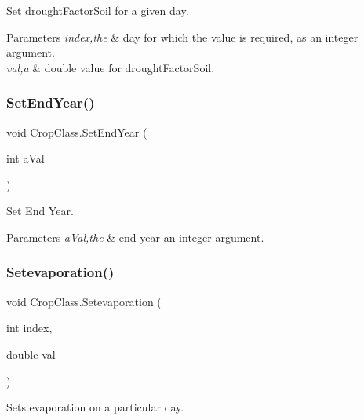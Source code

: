 Set drought\+Factor\+Soil for a given day. 


\begin{DoxyParams}{Parameters}
{\em index,the} & day for which the value is required, as an integer argument. \\
\hline
{\em val,a} & double value for drought\+Factor\+Soil. \\
\hline
\end{DoxyParams}
\mbox{\label{class_crop_class_aae4526fb10124338a29d0cfbcc93db7e}} 
\subsubsection{\texorpdfstring{SetEndYear()}{SetEndYear()}}
{\footnotesize\ttfamily void Crop\+Class.\+Set\+End\+Year (\begin{DoxyParamCaption}\item[{int}]{a\+Val }\end{DoxyParamCaption})\hspace{0.3cm}{\ttfamily [inline]}}



Set End Year. 


\begin{DoxyParams}{Parameters}
{\em a\+Val,the} & end year an integer argument. \\
\hline
\end{DoxyParams}
\mbox{\label{class_crop_class_a055c699749ec88e2eb2b5f1a1ebd79c5}} 
\subsubsection{\texorpdfstring{Setevaporation()}{Setevaporation()}}
{\footnotesize\ttfamily void Crop\+Class.\+Setevaporation (\begin{DoxyParamCaption}\item[{int}]{index,  }\item[{double}]{val }\end{DoxyParamCaption})\hspace{0.3cm}{\ttfamily [inline]}}



Sets evaporation on a particular day. 



